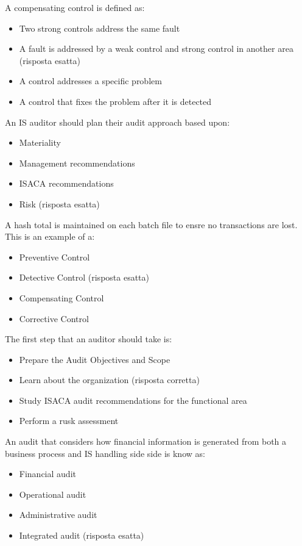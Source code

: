 
A compensating control is defined as:
\begin{itemize}
\item Two strong controls address the same fault
\item A fault is addressed by a weak control and strong control in another area (risposta esatta)
\item A control addresses a specific problem
\item A control that fixes the problem after it is detected
\end{itemize}



An IS auditor should plan their audit approach based upon:

\begin{itemize}
\item Materiality
\item Management recommendations
\item ISACA recommendations
\item Risk (risposta esatta)
\end{itemize}



A hash total is maintained on each batch file to ensre no transactions are lost. This is an example of a:
\begin{itemize}
\item Preventive Control
\item Detective Control (risposta esatta)
\item Compensating Control
\item Corrective Control
\end{itemize}




The first step that an auditor should take is:
\begin{itemize}
\item Prepare the Audit Objectives and Scope
\item Learn about the organization (risposta corretta)
\item Study ISACA audit recommendations for the functional area
\item Perform a rusk assessment
\end{itemize}


An audit that considers how financial information is generated from both a business process and IS handling side side is know as:
\begin{itemize}
\item Financial audit
\item Operational audit
\item Administrative audit
\item Integrated audit (risposta esatta)
\end{itemize}

